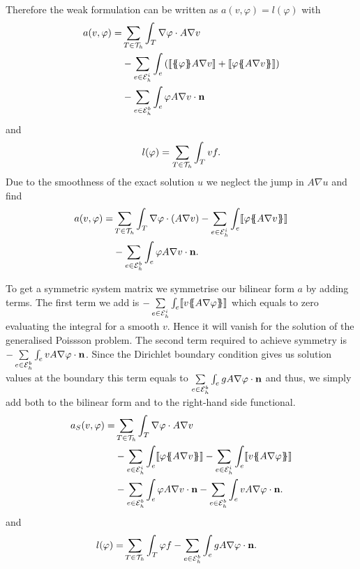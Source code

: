 Therefore the weak formulation can be written as $a(v,\varphi) = l(\varphi)$ with 
\begin{align*}
  a(v, \varphi) = & \sum\limits_{T \in \triang} \int_T \nabla \varphi \cdot A \nabla v \\
	& - \sum\limits_{e \in \edgesi}\int_{e} \left( \jump {\average \varphi A \nabla v} + \jump {\varphi \average{ A \nabla v}} \right)\\
& - \sum\limits_{e \in \edgesb}\int_{e} \varphi A \nabla v \cdot \mathbf n
\end{align*}
and
\[
l(\varphi) = \sum_{T \in \mathcal{T}_h} \int_T v f.
\]
Due to the smoothness of the exact solution $u$ we neglect the jump in $A \nabla u$ and find
\begin{align*}
 a(v, \varphi) = & \sum\limits_{T \in \triang} \int_T \nabla \varphi \cdot \left(A \nabla v\right) %
	- \sum\limits_{e \in \edgesi} \int _e\jump{ \varphi \average{ A \nabla v}} %
	\\
& - \sum\limits_{e \in \edgesb}\int_{e} \varphi A \nabla v \cdot \mathbf n.
\end{align*}

To get a symmetric system matrix we symmetrise our bilinear form $a$ by adding terms. 
The first term we add is  $- \sum\limits_{e \in \mathcal{E}_h^i}\int_{e} \llbracket  v \{\!\!\{  A \nabla \varphi \}\!\!\} \rrbracket$ which equals to zero evaluating the integral for a smooth $v$. Hence it will vanish for the solution of the generalised Poissson problem. The second term required to achieve symmetry is  $-\sum\limits_{e \in \mathcal{E}_h^b}\int_{e} v A \nabla \varphi \cdot \mathbf n$. Since the Dirichlet boundary condition gives us solution values at the boundary this term equals to $\sum\limits_{e \in \mathcal{E}_h^b}\int_{e} g A \nabla \varphi \cdot \mathbf n$ and thus, we simply add both to the bilinear form and to the right-hand side functional.
\begin{align}
 a_S(v, \varphi) = &\sum\limits_{T \in \triang} \int_T \nabla \varphi \cdot A \nabla v \nonumber \\
  &-\sum\limits_{e \in \edgesi}\int_{e} \jump {\varphi \average{A \nabla v} }
 - \sum\limits_{e \in \edgesi}\int_{e} \jump{ v \average{ A \nabla \varphi}} \nonumber\\ 
 & - \sum\limits_{e \in \edgesb}\int_{e} \varphi A \nabla v \cdot \mathbf n 
    - \sum\limits_{e \in \edgesb}\int_{e} v A \nabla \varphi \cdot \mathbf n. \label{eq:inner product SIPG}
\end{align}
and 
\begin{align}
	l(\varphi) =& \sum\limits_{T \in \mathcal{T}_h} \int_T \varphi f -\sum\limits_{e \in \mathcal{E}_h^b}\int_{e} g A \nabla \varphi \cdot \mathbf n.
\end{align} 

